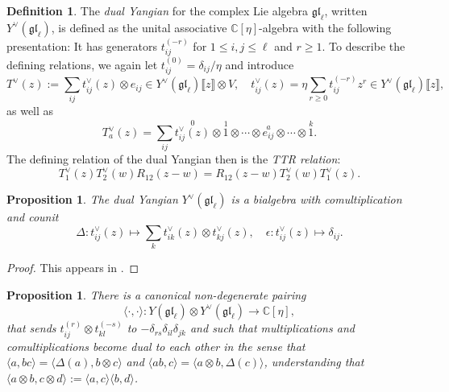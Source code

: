 \documentclass[11pt]{report}
\newtheorem{prop}[theorem]{Proposition}
\theoremstyle{definition}
\newtheorem{definition}[theorem]{Definition}
\theoremstyle{remark}
\theoremstyle{remark}
\newcommand{\C}{\mathbb{C}}
\begin{document}
\begin{definition}
The \emph{dual Yangian} for the complex Lie algebra $\mathfrak{gl}_\ell$, written $Y^\vee(\mathfrak{gl}_\ell)$, is defined as the unital associative $\C[\eta]$-algebra with the following presentation: It has generators $t_{ij}^{(-r)}$ for $1 \leq i,j \leq \ell$ and $r \geq 1$. To describe the defining relations, we again let $t_{ij}^{(0)} = \delta_{ij}/\eta$ and introduce
\begin{equation*}
T^\vee(z) := \sum_{ij} t_{ij}^\vee(z) \otimes e_{ij} \in Y^\vee(\mathfrak{gl}_\ell)\llbracket z \rrbracket \otimes V, \quad t_{ij}^\vee(z) = \eta \sum_{r \geq 0} t_{ij}^{(-r)} z^r \in Y^\vee(\mathfrak{gl}_\ell)\llbracket z \rrbracket,
\end{equation*}
as well as
\begin{equation*}
T_a^\vee(z) = \sum_{ij} \overset{0}{t_{ij}^\vee(z)} \otimes \overset{1}{1} \otimes \cdots \otimes \overset{a}{e_{ij}} \otimes \cdots \otimes \overset{k}{1}.
\end{equation*}
The defining relation of the dual Yangian then is the \emph{TTR relation}:
\begin{equation}\label{equation:TTRRelation}
T_1^\vee(z) T_2^\vee(w) R_{12}(z-w) = R_{12}(z-w) T_2^\vee(w) T_1^\vee(z).
\end{equation}
\end{definition}


\begin{prop}
The dual Yangian $Y^\vee(\mathfrak{gl}_\ell)$ is a bialgebra with comultiplication and counit
\begin{equation*}
\Delta: t_{ij}^\vee(z) \mapsto \sum_k t_{ik}^\vee(z) \otimes t_{kj}^\vee(z), \quad \epsilon: t_{ij}^\vee(z) \mapsto \delta_{ij}.
\end{equation*}
\end{prop}

\begin{proof}
This appears in \cite{article:nazarov:2019}.
\end{proof}

\begin{prop}
There is a canonical non-degenerate pairing
\begin{equation*}
\langle \cdot,\cdot \rangle: Y(\mathfrak{gl}_\ell) \otimes Y^\vee(\mathfrak{gl}_\ell) \to \C[\eta],
\end{equation*}
that sends $t_{ij}^{(r)} \otimes t_{kl}^{(-s)}$ to $-\delta_{rs} \delta_{il} \delta_{jk}$ and such that multiplications and comultiplications become dual to each other in the sense that $\langle a,bc \rangle = \langle \Delta(a),b \otimes c \rangle$ and $\langle ab,c \rangle = \langle a \otimes b,\Delta(c) \rangle$, understanding that $\langle a \otimes b, c \otimes d \rangle := \langle a,c \rangle \langle b,d \rangle$.
\end{prop}
\end{document}
